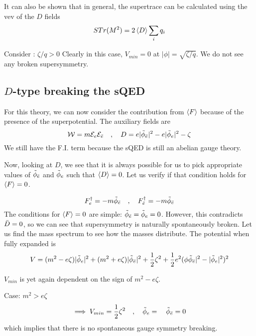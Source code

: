 It can also be shown that in general, the supertrace can be calculated using the vev of the $D$ fields
\begin{equation}
    STr(M^2) = 2\braket{D} \sum_i q_i
\end{equation}

Consider : $\zeta / q > 0$
Clearly in this case, $V_{min} = 0$ at $\vert \phi \vert = \sqrt{\zeta / q}$. We do not see any broken supersymmetry.

\subsection{$D$-type breaking the sQED}
For this theory, we can now consider the contribution from $\braket{F}$ because of the presence of the superpotential. The auxiliary fields are
\begin{equation}
    \mathcal{W} = m\mathcal{E}_e\mathcal{E}_{\Bar{e}} \quad , \quad D = e \vert \Tilde{\phi}_{\Bar{e}} \vert^2 - e \vert \Tilde{\phi}_e \vert^2 - \zeta
\end{equation}
We still have the F.I. term because the sQED is still an abelian gauge theory.

Now, looking at $D$, we see that it is always possible for us to pick appropriate values of $\Tilde{\phi}_{\Bar{e}}$ and $\Tilde{\phi}_e$ such that $\braket{D} = 0$. Let us verify if that condition holds for $\braket{F} = 0$.

\begin{equation}
    F^\dagger_e = -m \Tilde{\phi}_{\Bar{e}} \quad , \quad F^\dagger_{\Bar{e}} = -m \Tilde{\phi}_{\Bar{e}}
\end{equation}
The conditions for $\braket{F} = 0$ are simple: $\Tilde{\phi}_{\Bar{e}} = \Tilde{\phi}_e = 0$. However, this contradicts $\Bar{D} = 0$, so we can see that supersymmetry is naturally spontaneously broken. Let us find the mass spectrum to see how the masses distribute. The potential when fully expanded is
\begin{equation}
    V = (m^2 - e\zeta) \vert \Tilde{\phi}_e\vert^2 + (m^2 + e\zeta)\vert \Tilde{\phi}_{\Bar{e}}\vert^2 + \frac{1}{2} \zeta^2 + \frac{1}{2} e^2 (\phi \Tilde{\phi}_{\Bar{e}}\vert^2 - \vert\Tilde{\phi}_e\vert^2)^2
\end{equation}

$V_{min}$ is yet again dependent on the sign of $m^2 - e \zeta$. 

Case: $m^2 > e \zeta$
\begin{equation}
    \implies V_{min} = \frac{1}{2} \zeta^2 \quad , \quad \Tilde{\phi}_e = \quad \Tilde{\phi}_{\Bar{e}} = 0
\end{equation}
which implies that there is no spontaneous gauge symmetry breaking.

